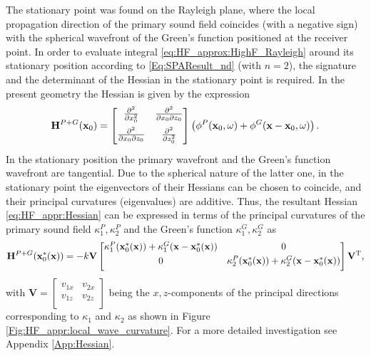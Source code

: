 The stationary point was found on the Rayleigh plane, where the local propagation direction of the primary sound field coincides (with a negative sign) with the spherical wavefront of the Green's function positioned at the receiver point. 
In order to evaluate integral \eqref{eq:HF_approx:HighF_Rayleigh} around its stationary position according to \eqref{Eq:SPAResult_nd} (with $n=2$), the signature and the determinant of the Hessian in the stationary point is required.
In the present geometry the Hessian is given by the expression
\begin{equation}
\mathbf{H}^{P+G}(\mathbf{x}_0) =
\begin{bmatrix} 
\frac{\partial^2}{\partial x_0^2} & \frac{\partial^2}{\partial x_0 \partial z_0} \\[.7em]
\frac{\partial^2}{\partial x_0 \partial z_0} & \frac{\partial^2}{\partial z_0^2}\\[0.5em] \end{bmatrix} 
\left( \phi^P(\mathbf{x}_0,\omega) + \phi^G(\mathbf{x}-\mathbf{x}_0,\omega)  \right).
\label{eq:HF_appr:Hessian}
\end{equation}
In the stationary position the primary wavefront and the Green's function wavefront are tangential.
Due to the spherical nature of the latter one, in the stationary point the eigenvectors of their Hessians can be chosen to coincide, and their principal curvatures (eigenvalues) are additive.
Thus, the resultant Hessian \eqref{eq:HF_appr:Hessian} can be expressed in terms of the principal curvatures of the primary sound field $\kappa_1^P, \kappa_2^P$ and the Green's function $\kappa_1^G, \kappa_2^G$ as
\begin{equation}
\mathbf{H}^{P+G}(\mathbf{x}_0^*(\mathbf{x})) = -k
\mathbf{V}
\begin{bmatrix} 
\kappa_1^P(\mathbf{x}_0^*(\mathbf{x})) + \kappa_1^G(\mathbf{x}-\mathbf{x}_0^*(\mathbf{x})) & 0 \\[.3em]
0 & \kappa_2^P(\mathbf{x}_0^*(\mathbf{x})) + \kappa_2^G(\mathbf{x}-\mathbf{x}_0^*(\mathbf{x})) \\[.5em] \end{bmatrix}
\mathbf{V}^{\mathrm{T}},
\end{equation}
with $\mathbf{V} = \begin{bmatrix} 
v_{1 x} & v_{2 x} \\[.1em]
v_{1 z} & v_{2 z}\\[.3em] \end{bmatrix}$ being the $x,z$-components of the principal directions corresponding to $\kappa_1$ and $\kappa_2$ as shown in Figure \ref{Fig:HF_appr:local_wave_curvature}.
For a more detailed investigation see Appendix \ref{App:Hessian}.

